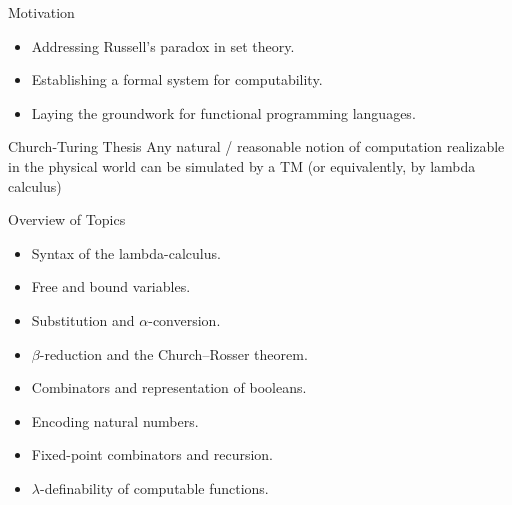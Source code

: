 \documentclass{beamer}
\begin{document}

\begin{frame}{Motivation}
  \begin{itemize}
    \item Addressing Russell’s paradox in set theory.
    \item Establishing a formal system for computability.
    \item Laying the groundwork for functional programming languages.
  \end{itemize}
\end{frame}

\begin{frame}{Church-Turing Thesis}
Any natural / reasonable notion of computation realizable in the physical world can be simulated by a TM (or equivalently, by lambda calculus)
\end{frame}

\begin{frame}{Overview of Topics}
  \begin{itemize}
    \item Syntax of the lambda-calculus.
    \item Free and bound variables.
    \item Substitution and $\alpha$-conversion.
    \item $\beta$-reduction and the Church–Rosser theorem.
    \item Combinators and representation of booleans.
    \item Encoding natural numbers.
    \item Fixed-point combinators and recursion.
    \item $\lambda$-definability of computable functions.
  \end{itemize}
\end{frame}
\end{document}

